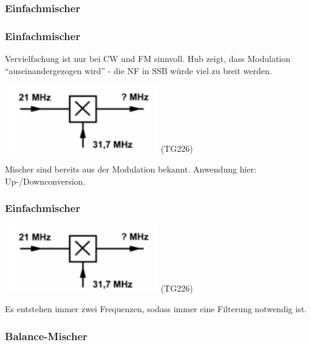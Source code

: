 \subsubsection{Einfachmischer}

\begin{frame}
    \frametitle{Einfachmischer}

    Vervielfachung ist nur bei CW und FM sinnvoll. Hub zeigt, dass Modulation
    "`auseinandergezogen wird"' - die NF in SSB würde viel zu breit werden.

    \begin{center}
        \includegraphics[width=0.5\textwidth]{a13/TG226.png}
        \tiny (TG226)
    \end{center}

    Mischer sind bereits aus der Modulation bekannt. Anwendung hier:
    Up-/Downconversion.
    

\end{frame}

\begin{frame}
    \frametitle{Einfachmischer}

    \begin{center}
        \includegraphics[width=0.5\textwidth]{a13/TG226.png}
        \tiny (TG226)
    \end{center}

    Es entstehen immer zwei Frequenzen, sodass immer eine Filterung notwendig
    ist.

\end{frame}

\subsubsection{Balance-Mischer}


